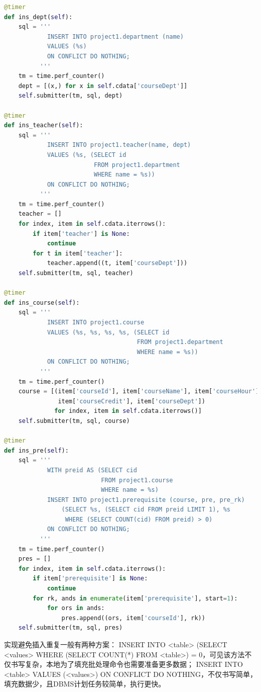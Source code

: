 \begin{lstlisting}[language=python]
@timer
def ins_dept(self):
    sql = '''
            INSERT INTO project1.department (name)
            VALUES (%s)
            ON CONFLICT DO NOTHING;
          '''
    tm = time.perf_counter()
    dept = [(x,) for x in self.cdata['courseDept']]
    self.submitter(tm, sql, dept)

@timer
def ins_teacher(self):
    sql = '''
            INSERT INTO project1.teacher(name, dept)
            VALUES (%s, (SELECT id
                         FROM project1.department
                         WHERE name = %s))
            ON CONFLICT DO NOTHING;
          '''
    tm = time.perf_counter()
    teacher = []
    for index, item in self.cdata.iterrows():
        if item['teacher'] is None:
            continue
        for t in item['teacher']:
            teacher.append((t, item['courseDept']))
    self.submitter(tm, sql, teacher)

@timer
def ins_course(self):
    sql = '''
            INSERT INTO project1.course
            VALUES (%s, %s, %s, %s, (SELECT id
                                     FROM project1.department
                                     WHERE name = %s))
            ON CONFLICT DO NOTHING;
          '''
    tm = time.perf_counter()
    course = [(item['courseId'], item['courseName'], item['courseHour'],
               item['courseCredit'], item['courseDept'])
              for index, item in self.cdata.iterrows()]
    self.submitter(tm, sql, course)

@timer
def ins_pre(self):
    sql = '''
            WITH preid AS (SELECT cid
                           FROM project1.course
                           WHERE name = %s)
            INSERT INTO project1.prerequisite (course, pre, pre_rk)
                (SELECT %s, (SELECT cid FROM preid LIMIT 1), %s
                 WHERE (SELECT COUNT(cid) FROM preid) > 0)
            ON CONFLICT DO NOTHING;
          '''
    tm = time.perf_counter()
    pres = []
    for index, item in self.cdata.iterrows():
        if item['prerequisite'] is None:
            continue
        for rk, ands in enumerate(item['prerequisite'], start=1):
            for ors in ands:
                pres.append((ors, item['courseId'], rk))
    self.submitter(tm, sql, pres)
\end{lstlisting}
\vspace{-3em}\par
实现避免插入重复一般有两种方案： INSERT INTO <table> (SELECT <values> WHERE (SELECT COUNT(*) FROM <table>) = 0，可见该方法不仅书写复杂，本地为了填充批处理命令也需要准备更多数据； INSERT INTO <table> VALUES (<values>) ON CONFLICT DO NOTHING，不仅书写简单，填充数据少，且DBMS计划任务较简单，执行更快。\\~\\

